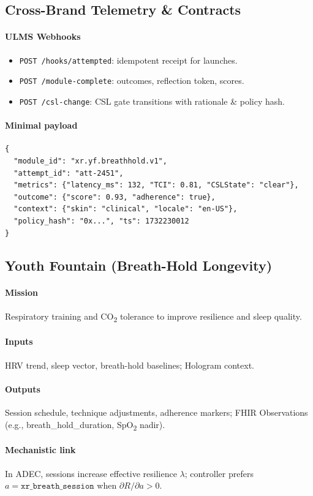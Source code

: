 \documentclass[11pt]{article}
\theoremstyle{plain}
\begin{document}
\subsection{Cross-Brand Telemetry \& Contracts}
\paragraph{ULMS Webhooks}
\begin{itemize}
  \item \texttt{POST /hooks/attempted}: idempotent receipt for launches.
  \item \texttt{POST /module-complete}: outcomes, reflection token, scores.
  \item \texttt{POST /csl-change}: CSL gate transitions with rationale \& policy hash.
\end{itemize}
\paragraph{Minimal payload}
\begin{verbatim}
{
  "module_id": "xr.yf.breathhold.v1",
  "attempt_id": "att-2451",
  "metrics": {"latency_ms": 132, "TCI": 0.81, "CSLState": "clear"},
  "outcome": {"score": 0.93, "adherence": true},
  "context": {"skin": "clinical", "locale": "en-US"},
  "policy_hash": "0x...", "ts": 1732230012
}
\end{verbatim}

\subsection{Youth Fountain (Breath-Hold Longevity)}
\paragraph{Mission} Respiratory training and CO\textsubscript{2} tolerance to improve resilience and sleep quality.
\paragraph{Inputs} HRV trend, sleep vector, breath-hold baselines; Hologram context.
\paragraph{Outputs} Session schedule, technique adjustments, adherence markers; FHIR Observations (e.g., breath\_hold\_duration, SpO\textsubscript{2} nadir).
\paragraph{Mechanistic link} In ADEC, sessions increase effective resilience $\lambda$; controller prefers $a=\texttt{xr\_breath\_session}$ when $\partial R/\partial a > 0$.
\end{document}
